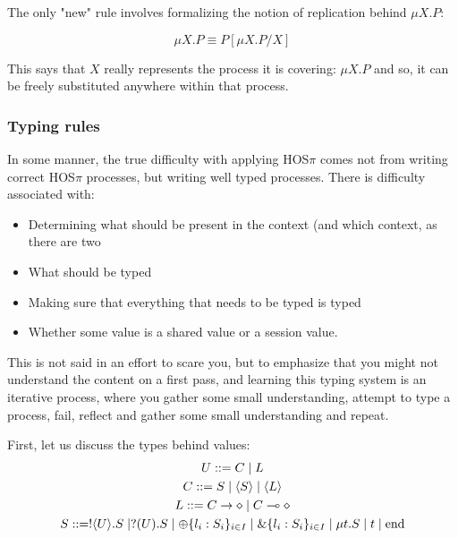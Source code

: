 The only "new" rule involves formalizing the notion of replication behind $\mu X . P$:

$$
\mu X . P \equiv P [\mu X . P/ X]
$$

This says that $X$ really represents the process it is covering: $\mu X . P$ and so, it can be freely substituted anywhere within that process.

\subsubsection{Typing rules}

In some manner, the true difficulty with applying HOS$\pi$ comes not from writing correct HOS$\pi$ processes, but writing well typed processes. There is difficulty associated with:
\begin{itemize}
\item Determining what should be present in the context (and which context, as there are two
\item What should be typed
\item Making sure that everything that needs to be typed is typed
\item Whether some value is a shared value or a session value.
\end{itemize}

This is not said in an effort to scare you, but to emphasize that you might not understand the content on a first pass, and learning this typing system is an iterative process, where you gather some small understanding, attempt to type a process, fail, reflect and gather some small understanding and repeat.

First, let us discuss the types behind values:
\begin{gather*}
U ::= C \mid L \\
C ::= S \mid \langle S \rangle \mid \langle L \rangle \\
L ::= C \rightarrow \diamond \mid C \multimap \diamond \\
S ::= !\langle U \rangle . S \mid ?(U).S \mid \oplus \{l_i : S_i\}_{i \in I} \mid \&\{l_i : S_i\}_{i \in I} \mid \mu t. S \mid t \mid \text{end}
\end{gather*}

